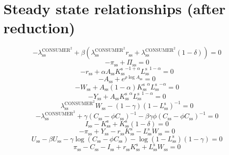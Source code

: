 \section{Steady state relationships (after reduction)}

\begin{equation}
-\lambda^{\mathrm{CONSUMER}^{\mathrm{2}}}_\mathrm{ss} + {\beta} \left({\lambda^{\mathrm{CONSUMER}^{\mathrm{2}}}_\mathrm{ss}} {r_\mathrm{ss}} + {\lambda^{\mathrm{CONSUMER}^{\mathrm{2}}}_\mathrm{ss}} \left(1 - \delta\right)\right) = 0
\end{equation}
\begin{equation}
-\pi_\mathrm{ss} + \Pi_\mathrm{ss} = 0
\end{equation}
\begin{equation}
-r_\mathrm{ss} + {\alpha} {A_\mathrm{ss}} {{K^{\mathrm{s}}_\mathrm{ss}}^{-1 + \alpha}} {{L^{\mathrm{s}}_\mathrm{ss}}^{1 - \alpha}} = 0
\end{equation}
\begin{equation}
-A_\mathrm{ss} + e^{{\rho} {\log{A_\mathrm{ss}}}} = 0
\end{equation}
\begin{equation}
-W_\mathrm{ss} + {A_\mathrm{ss}} \left(1 - \alpha\right) {{K^{\mathrm{s}}_\mathrm{ss}}^{\alpha}} {{L^{\mathrm{s}}_\mathrm{ss}}^{-\alpha}} = 0
\end{equation}
\begin{equation}
-Y_\mathrm{ss} + {A_\mathrm{ss}} {{K^{\mathrm{s}}_\mathrm{ss}}^{\alpha}} {{L^{\mathrm{s}}_\mathrm{ss}}^{1 - \alpha}} = 0
\end{equation}
\begin{equation}
{\lambda^{\mathrm{CONSUMER}^{\mathrm{2}}}_\mathrm{ss}} {W_\mathrm{ss}} - \left(1 - \gamma\right) \left(1 - L^{\mathrm{s}}_\mathrm{ss}\right)^{-1} = 0
\end{equation}
\begin{equation}
-\lambda^{\mathrm{CONSUMER}^{\mathrm{2}}}_\mathrm{ss} + {\gamma} \left(C_\mathrm{ss} - {\phi} {C_\mathrm{ss}}\right)^{-1} - {\beta} {\gamma} {\phi} \left(C_\mathrm{ss} - {\phi} {C_\mathrm{ss}}\right)^{-1} = 0
\end{equation}
\begin{equation}
I_\mathrm{ss} - K^{\mathrm{s}}_\mathrm{ss} + {K^{\mathrm{s}}_\mathrm{ss}} \left(1 - \delta\right) = 0
\end{equation}
\begin{equation}
-\pi_\mathrm{ss} + Y_\mathrm{ss} - {r_\mathrm{ss}} {K^{\mathrm{s}}_\mathrm{ss}} - {L^{\mathrm{s}}_\mathrm{ss}} {W_\mathrm{ss}} = 0
\end{equation}
\begin{equation}
U_\mathrm{ss} - {\beta} {U_\mathrm{ss}} - {\gamma} {\log\left(C_\mathrm{ss} - {\phi} {C_\mathrm{ss}}\right)} - {\log\left(1 - L^{\mathrm{s}}_\mathrm{ss}\right)} \left(1 - \gamma\right) = 0
\end{equation}
\begin{equation}
\pi_\mathrm{ss} - C_\mathrm{ss} - I_\mathrm{ss} + {r_\mathrm{ss}} {K^{\mathrm{s}}_\mathrm{ss}} + {L^{\mathrm{s}}_\mathrm{ss}} {W_\mathrm{ss}} = 0
\end{equation}






